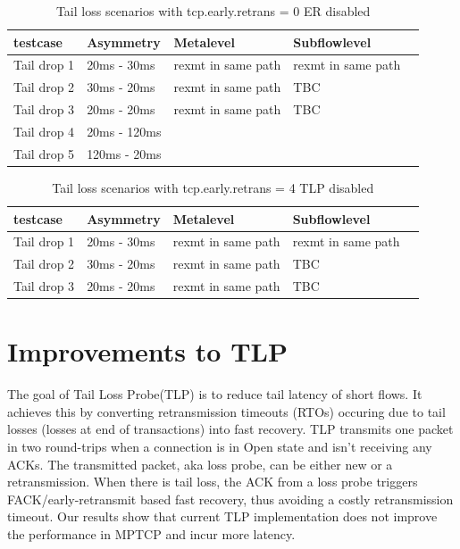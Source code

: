 \documentclass[10pt,draftcls,twocolumn]{IEEEconf}
\begin{document}
\begin{table}[!ht]
\centering
\caption{Tail loss scenarios with tcp.early.retrans = 0 ER disabled}
\label{ret0}
\begin{tabular}{|l|l|l|l|l|}
\hline
 testcase   & Asymmetry   & Metalevel          & Subflowlevel       &  \\\hline
Tail drop 1 & 20ms - 30ms & rexmt in same path & rexmt in same path &  \\\hline
Tail drop 2 & 30ms - 20ms & rexmt in same path & TBC                &  \\\hline
Tail drop 3 & 20ms - 20ms & rexmt in same path & TBC                & \\ \hline
Tail drop 4 & 20ms - 120ms &  			&		&  \\ \hline
Tail drop 5 & 120ms - 20ms &  			& 		& \\ \hline 
\end{tabular}
\end{table}


\begin{table}[!ht]
\centering
\caption{Tail loss scenarios with tcp.early.retrans = 4 TLP disabled}
\label{ret4}
\begin{tabular}{|l|l|l|l|l|}
\hline
 testcase   & Asymmetry   & Metalevel          & Subflowlevel       &  \\\hline
Tail drop 1 & 20ms - 30ms & rexmt in same path & rexmt in same path &  \\\hline
Tail drop 2 & 30ms - 20ms & rexmt in same path & TBC                &  \\\hline
Tail drop 3 & 20ms - 20ms & rexmt in same path & TBC                & \\ \hline
\end{tabular}
\end{table}


\section{Improvements to TLP}
The goal of Tail Loss Probe(TLP) is to reduce tail latency of short flows. It achieves this by converting retransmission timeouts (RTOs) occuring due to tail losses (losses at end of transactions) into fast recovery. TLP transmits one packet in two round-trips when a connection is in Open state and isn't receiving any ACKs. The transmitted packet, aka loss probe, can be either new or a retransmission. When there is tail loss, the ACK from a loss probe triggers FACK/early-retransmit based fast recovery, thus avoiding a costly retransmission timeout. Our results show that current TLP implementation does not improve the performance in MPTCP and incur more latency.
\end{document}
